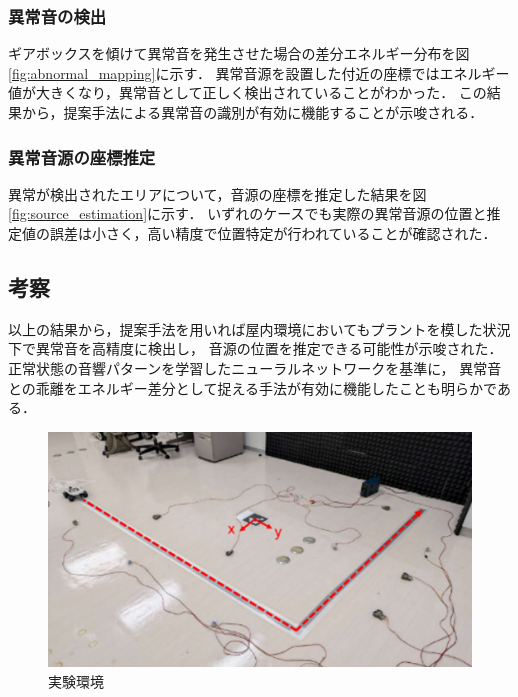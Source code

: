 \documentclass[../main]{subfiles}
\begin{document}
\subsubsection{異常音の検出} \label{subsubsec:anomaly_detection}

ギアボックスを傾けて異常音を発生させた場合の差分エネルギー分布を図\ref{fig:abnormal_mapping}に示す．
異常音源を設置した付近の座標ではエネルギー値が大きくなり，異常音として正しく検出されていることがわかった．
この結果から，提案手法による異常音の識別が有効に機能することが示唆される．

\subsubsection{異常音源の座標推定} \label{subsubsec:source_localization}

異常が検出されたエリアについて，音源の座標を推定した結果を図\ref{fig:source_estimation}に示す．
いずれのケースでも実際の異常音源の位置と推定値の誤差は小さく，高い精度で位置特定が行われていることが確認された．

\subsection{考察} \label{subsec:discussion}

以上の結果から，提案手法を用いれば屋内環境においてもプラントを模した状況下で異常音を高精度に検出し，
音源の位置を推定できる可能性が示唆された．
正常状態の音響パターンを学習したニューラルネットワークを基準に，
異常音との乖離をエネルギー差分として捉える手法が有効に機能したことも明らかである．
\label{subsec:vexp_ref_result}


\begin{figure}[t]
  \centering
  \includegraphics[keepaspectratio, width=1.0\linewidth]{chap4/env_experiment.png}
  \caption{実験環境}
  \label{fig:exp_setup}
\end{figure}
\end{document}
